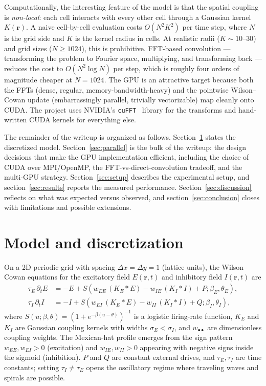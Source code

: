 \documentclass[11pt]{article}
\begin{document}
Computationally, the interesting feature of the model is that the
spatial coupling is \emph{non-local}: each cell interacts with every
other cell through a Gaussian kernel $K(\mathbf{r})$. A naive
cell-by-cell evaluation costs $O(N^{2} K^{2})$ per time step, where $N$
is the grid side and $K$ is the kernel radius in cells. At realistic
radii ($K \!\sim\! 10$--$30$) and grid sizes ($N \!\geq\! 1024$), this
is prohibitive. FFT-based convolution --- transforming the problem to
Fourier space, multiplying, and transforming back --- reduces the cost
to $O(N^{2} \log N)$ per step, which is roughly four orders of
magnitude cheaper at $N = 1024$. The GPU is an attractive target because
both the FFTs (dense, regular, memory-bandwidth-heavy) and the
pointwise Wilson--Cowan update (embarrassingly parallel, trivially
vectorizable) map cleanly onto CUDA. The project uses NVIDIA's
\texttt{cuFFT}~\cite{cufft} library for the transforms and hand-written
CUDA kernels for everything else.

The remainder of the writeup is organized as follows.
Section~\ref{sec:model} states the discretized model.
Section~\ref{sec:parallel} is the bulk of the writeup: the design
decisions that make the GPU implementation efficient, including the
choice of CUDA over MPI/OpenMP, the FFT-vs-direct-convolution
tradeoff, and the multi-GPU strategy. Section~\ref{sec:setup}
describes the experimental setup, and section~\ref{sec:results}
reports the measured performance. Section~\ref{sec:discussion} reflects
on what was expected versus observed, and section~\ref{sec:conclusion}
closes with limitations and possible extensions.

\section{Model and discretization}
\label{sec:model}

On a 2D periodic grid with spacing $\Delta x = \Delta y = 1$ (lattice
units), the Wilson--Cowan equations for the excitatory field
$E(\mathbf{r}, t)$ and inhibitory field $I(\mathbf{r}, t)$ are
%
\begin{align}
  \tau_{E}\,\partial_{t} E &= -E + S\!\left(w_{EE}\,(K_{E}\!*\!E)
     - w_{IE}\,(K_{I}\!*\!I) + P; \beta_{E}, \theta_{E}\right), \\
  \tau_{I}\,\partial_{t} I &= -I + S\!\left(w_{EI}\,(K_{E}\!*\!E)
     - w_{II}\,(K_{I}\!*\!I) + Q; \beta_{I}, \theta_{I}\right),
\end{align}
%
where $S(u; \beta, \theta) = (1 + e^{-\beta(u-\theta)})^{-1}$ is a
logistic firing-rate function, $K_{E}$ and $K_{I}$ are Gaussian
coupling kernels with widths $\sigma_{E} < \sigma_{I}$, and
$w_{\bullet\bullet}$ are dimensionless coupling weights. The
Mexican-hat profile emerges from the sign pattern $w_{EE}, w_{EI}
> 0$ (excitation) and $w_{IE}, w_{II} > 0$ appearing with negative
signs inside the sigmoid (inhibition). $P$ and $Q$ are constant
external drives, and $\tau_{E}, \tau_{I}$ are time constants;
setting $\tau_{I} \neq \tau_{E}$ opens the oscillatory regime where
traveling waves and spirals are possible.
\end{document}
